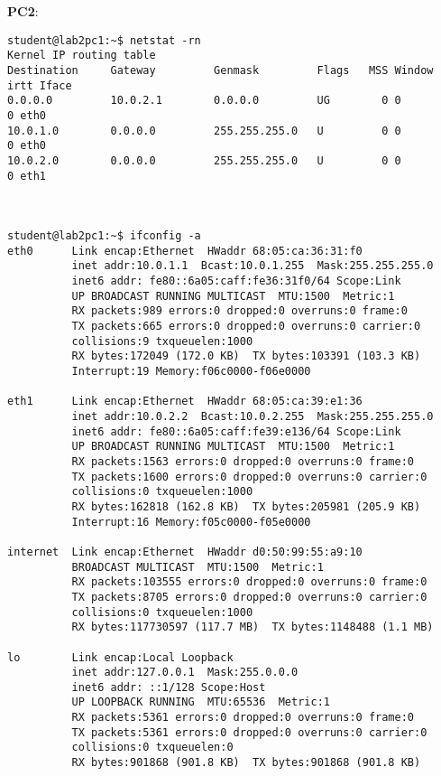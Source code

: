 \textbf{PC2}:
\begin{lstlisting}
student@lab2pc1:~$ netstat -rn
Kernel IP routing table
Destination     Gateway         Genmask         Flags   MSS Window  irtt Iface
0.0.0.0         10.0.2.1        0.0.0.0         UG        0 0          0 eth0
10.0.1.0        0.0.0.0         255.255.255.0   U         0 0          0 eth0
10.0.2.0        0.0.0.0         255.255.255.0   U         0 0          0 eth1



student@lab2pc1:~$ ifconfig -a
eth0      Link encap:Ethernet  HWaddr 68:05:ca:36:31:f0  
          inet addr:10.0.1.1  Bcast:10.0.1.255  Mask:255.255.255.0
          inet6 addr: fe80::6a05:caff:fe36:31f0/64 Scope:Link
          UP BROADCAST RUNNING MULTICAST  MTU:1500  Metric:1
          RX packets:989 errors:0 dropped:0 overruns:0 frame:0
          TX packets:665 errors:0 dropped:0 overruns:0 carrier:0
          collisions:9 txqueuelen:1000 
          RX bytes:172049 (172.0 KB)  TX bytes:103391 (103.3 KB)
          Interrupt:19 Memory:f06c0000-f06e0000 

eth1      Link encap:Ethernet  HWaddr 68:05:ca:39:e1:36  
          inet addr:10.0.2.2  Bcast:10.0.2.255  Mask:255.255.255.0
          inet6 addr: fe80::6a05:caff:fe39:e136/64 Scope:Link
          UP BROADCAST RUNNING MULTICAST  MTU:1500  Metric:1
          RX packets:1563 errors:0 dropped:0 overruns:0 frame:0
          TX packets:1600 errors:0 dropped:0 overruns:0 carrier:0
          collisions:0 txqueuelen:1000 
          RX bytes:162818 (162.8 KB)  TX bytes:205981 (205.9 KB)
          Interrupt:16 Memory:f05c0000-f05e0000 

internet  Link encap:Ethernet  HWaddr d0:50:99:55:a9:10  
          BROADCAST MULTICAST  MTU:1500  Metric:1
          RX packets:103555 errors:0 dropped:0 overruns:0 frame:0
          TX packets:8705 errors:0 dropped:0 overruns:0 carrier:0
          collisions:0 txqueuelen:1000 
          RX bytes:117730597 (117.7 MB)  TX bytes:1148488 (1.1 MB)

lo        Link encap:Local Loopback  
          inet addr:127.0.0.1  Mask:255.0.0.0
          inet6 addr: ::1/128 Scope:Host
          UP LOOPBACK RUNNING  MTU:65536  Metric:1
          RX packets:5361 errors:0 dropped:0 overruns:0 frame:0
          TX packets:5361 errors:0 dropped:0 overruns:0 carrier:0
          collisions:0 txqueuelen:0 
          RX bytes:901868 (901.8 KB)  TX bytes:901868 (901.8 KB)
\end{lstlisting}

